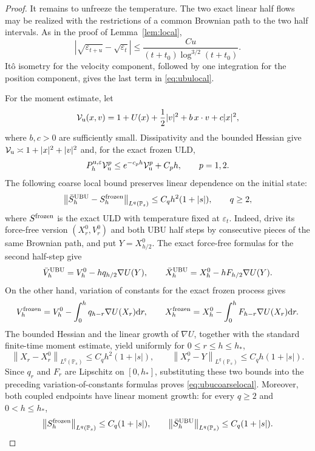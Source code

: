 \documentclass[11pt]{article}
\theoremstyle{definition}
\newcommand{\dd}{\mathrm d}
\newcommand{\eps}{\varepsilon}
\begin{document}
\begin{proof}
It remains to unfreeze the temperature. The two exact linear half flows may
be realized with the restrictions of a common Brownian path to the two half
intervals. As in the proof of Lemma~\ref{lem:local},
\[
 |\sqrt{\eps_{t+u}}-\sqrt{\eps_t}|
 \leq \frac{Cu}{(t+t_0)\log^{3/2}(t+t_0)}.
\]
It\^o isometry for the velocity component, followed by one integration for
the position component, gives the last term in \eqref{eq:ubulocal}.

For the moment estimate, let
\[
 \mathcal V_{\rm u}(x,v)
 =1+U(x)+\frac12|v|^2+b\,x\cdot v+c|x|^2,
\]
where $b,c>0$ are sufficiently small. Dissipativity and the bounded Hessian
give $\mathcal V_{\rm u}\asymp1+|x|^2+|v|^2$ and, for the exact frozen ULD,
\[
 P^{{\rm u},\eps}_h\mathcal V_{\rm u}^p
 \leq e^{-c_ph}\mathcal V_{\rm u}^p+C_ph,
 \qquad p=1,2.
\]
The following coarse local bound preserves linear dependence on the initial
state:
\begin{equation}\label{eq:ubucoarselocal}
 \left\|\bar S_h^{\rm UBU}-S_h^{\rm frozen}\right\|_{L^q(\mathbb P_s)}
 \leq C_qh^2(1+|s|),\qquad q\geq2,
\end{equation}
where $S^{\rm frozen}$ is the exact ULD with temperature fixed at $\eps_t$.
Indeed, drive its force-free version $\left(X_r^0,V_r^0\right)$ and both UBU half
steps by consecutive pieces of the same Brownian path, and put
$Y=X_{h/2}^0$. The exact force-free formulas for the second half-step give
\[
 \bar V_h^{\rm UBU}=V_h^0-hq_{h/2}\nabla U(Y),\qquad
 \bar X_h^{\rm UBU}=X_h^0-hF_{h/2}\nabla U(Y).
\]
On the other hand, variation of constants for the exact frozen process gives
\[
 V_h^{\rm frozen}=V_h^0-\int_0^h q_{h-r}\nabla U(X_r)\dd r,
 \qquad
 X_h^{\rm frozen}=X_h^0-\int_0^h F_{h-r}\nabla U(X_r)\dd r.
\]
The bounded Hessian and the linear growth of $\nabla U$, together with the
standard finite-time moment estimate, yield uniformly for
$0\leq r\leq h\leq h_*$,
\[
 \left\|X_r-X_r^0\right\|_{L^q(\mathbb P_s)}\leq C_qh^2(1+|s|),\qquad
 \left\|X_r^0-Y\right\|_{L^q(\mathbb P_s)}\leq C_qh(1+|s|).
\]
Since $q_r$ and $F_r$ are Lipschitz on $[0,h_*]$, substituting these two
bounds into the preceding variation-of-constants formulas proves
\eqref{eq:ubucoarselocal}. Moreover, both coupled endpoints have linear
moment growth: for every $q\geq2$ and $0<h\leq h_*$,
\begin{equation}\label{eq:ubuendpointmoments}
 \left\|S_h^{\rm frozen}\right\|_{L^q(\mathbb P_s)}\leq C_q(1+|s|),
 \qquad
 \left\|\bar S_h^{\rm UBU}\right\|_{L^q(\mathbb P_s)}\leq C_q(1+|s|).
\end{equation}

\end{proof}
\end{document}
